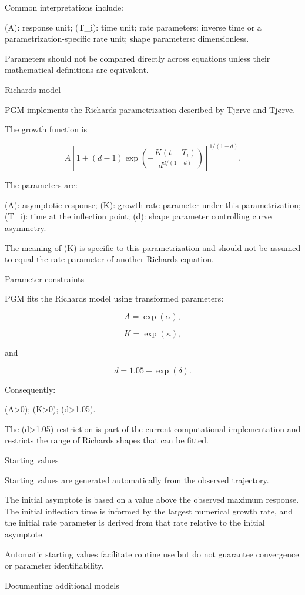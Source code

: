 \documentclass[
  english,
  letterpaper,
  DIV=11,
  numbers=noendperiod]{scrreprt}
\begin{document}
Common interpretations include:

(A): response unit; (T\_i): time unit; rate parameters: inverse time or
a parametrization-specific rate unit; shape parameters: dimensionless.

Parameters should not be compared directly across equations unless their
mathematical definitions are equivalent.

Richards model

PGM implements the Richards parametrization described by Tjørve and
Tjørve.

The growth function is

\[
A
\left[
1+
(d-1)
\exp\left(
-\frac{K(t-T_i)}
{d^{d/(1-d)}}
\right)
\right]^{1/(1-d)}.
\]

The parameters are:

(A): asymptotic response; (K): growth-rate parameter under this
parametrization; (T\_i): time at the inflection point; (d): shape
parameter controlling curve asymmetry.

The meaning of (K) is specific to this parametrization and should not be
assumed to equal the rate parameter of another Richards equation.

Parameter constraints

PGM fits the Richards model using transformed parameters:

\[
A=\exp(\alpha),
\]

\[
K=\exp(\kappa),
\]

and

\[
d=1.05+\exp(\delta).
\]

Consequently:

(A\textgreater0); (K\textgreater0); (d\textgreater1.05).

The (d\textgreater1.05) restriction is part of the current computational
implementation and restricts the range of Richards shapes that can be
fitted.

Starting values

Starting values are generated automatically from the observed
trajectory.

The initial asymptote is based on a value above the observed maximum
response. The initial inflection time is informed by the largest
numerical growth rate, and the initial rate parameter is derived from
that rate relative to the initial asymptote.

Automatic starting values facilitate routine use but do not guarantee
convergence or parameter identifiability.

Documenting additional models
\end{document}
